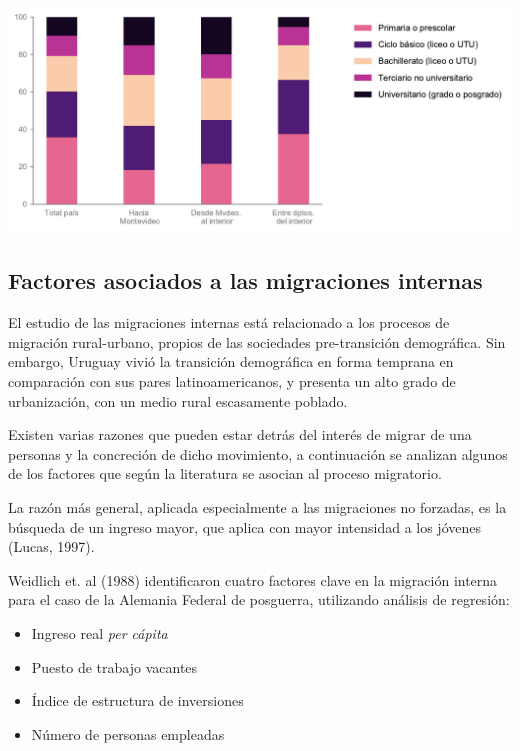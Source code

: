 \documentclass[12pt,spanish,]{article}
\providecommand{\tightlist}{%
  \setlength{\itemsep}{0pt}\setlength{\parskip}{0pt}}
\let\origfigure\figure
\let\endorigfigure\endfigure
\renewenvironment{figure}[1][2] {
    \expandafter\origfigure\expandafter[H]
} {
    \endorigfigure
}
\begin{document}
\begin{figure}
\centering
\includegraphics{./tex2pdf.-8c1f0593c1a83dbe/f71a7e5209d4cb5db71480e46fca3e283c9632b3.pdf}
\caption{Máximo nivel educativo alcanzado.}
\end{figure}

\newpage

\hypertarget{factores-asociados-a-las-migraciones-internas}{%
\subsection{Factores asociados a las migraciones
internas}\label{factores-asociados-a-las-migraciones-internas}}

El estudio de las migraciones internas está relacionado a los procesos
de migración rural-urbano, propios de las sociedades pre-transición
demográfica. Sin embargo, Uruguay vivió la transición demográfica en
forma temprana en comparación con sus pares latinoamericanos, y presenta
un alto grado de urbanización, con un medio rural escasamente poblado.

Existen varias razones que pueden estar detrás del interés de migrar de
una personas y la concreción de dicho movimiento, a continuación se
analizan algunos de los factores que según la literatura se asocian al
proceso migratorio.

La razón más general, aplicada especialmente a las migraciones no
forzadas, es la búsqueda de un ingreso mayor, que aplica con mayor
intensidad a los jóvenes (Lucas, 1997).

Weidlich et. al (1988) identificaron cuatro factores clave en la
migración interna para el caso de la Alemania Federal de posguerra,
utilizando análisis de regresión:

\begin{itemize}
\tightlist
\item
  Ingreso real \emph{per cápita}
\item
  Puesto de trabajo vacantes
\item
  Índice de estructura de inversiones
\item
  Número de personas empleadas
\end{itemize}
\end{document}
